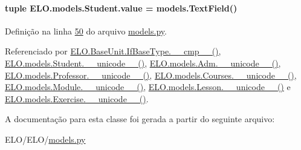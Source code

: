 \hypertarget{classELO_1_1models_1_1Student_a201226779dce6e064cb16bd92ed016e2}{}
\paragraph[{value}]{\setlength{\rightskip}{0pt plus 5cm}tuple E\+L\+O.\+models.\+Student.\+value = models.\+Text\+Field()\hspace{0.3cm}{\ttfamily [static]}}\label{classELO_1_1models_1_1Student_a201226779dce6e064cb16bd92ed016e2}


Definição na linha \hyperlink{ELO_2models_8py_source_l00050}{50} do arquivo \hyperlink{ELO_2models_8py_source}{models.\+py}.



Referenciado por \hyperlink{classELO_1_1BaseUnit_1_1IfBaseType_a22d6f30c4d9504a9c20d0ff5a538544d}{E\+L\+O.\+Base\+Unit.\+If\+Base\+Type.\+\_\+\+\_\+cmp\+\_\+\+\_\+()}, \hyperlink{classELO_1_1models_1_1Student_aed993e386d125c955def72680b441dd1}{E\+L\+O.\+models.\+Student.\+\_\+\+\_\+unicode\+\_\+\+\_\+()}, \hyperlink{classELO_1_1models_1_1Adm_a321eaeaced2b6423fd23ad9d0401808e}{E\+L\+O.\+models.\+Adm.\+\_\+\+\_\+unicode\+\_\+\+\_\+()}, \hyperlink{classELO_1_1models_1_1Professor_a8c0714e4a283c139c0d7aed94a498a7b}{E\+L\+O.\+models.\+Professor.\+\_\+\+\_\+unicode\+\_\+\+\_\+()}, \hyperlink{classELO_1_1models_1_1Courses_a8676cba71b99ab2ba60726b9b5e33825}{E\+L\+O.\+models.\+Courses.\+\_\+\+\_\+unicode\+\_\+\+\_\+()}, \hyperlink{classELO_1_1models_1_1Module_a8fc9fadf09fa7b3bbcfea69ebe25d278}{E\+L\+O.\+models.\+Module.\+\_\+\+\_\+unicode\+\_\+\+\_\+()}, \hyperlink{classELO_1_1models_1_1Lesson_a53e265de97c6b73f262f62a80f9ca994}{E\+L\+O.\+models.\+Lesson.\+\_\+\+\_\+unicode\+\_\+\+\_\+()} e \hyperlink{classELO_1_1models_1_1Exercise_a23f81c66e4d6bc5a4582d74d191f5117}{E\+L\+O.\+models.\+Exercise.\+\_\+\+\_\+unicode\+\_\+\+\_\+()}.



A documentação para esta classe foi gerada a partir do seguinte arquivo\+:\begin{DoxyCompactItemize}
\item 
E\+L\+O/\+E\+L\+O/\hyperlink{ELO_2models_8py}{models.\+py}\end{DoxyCompactItemize}
